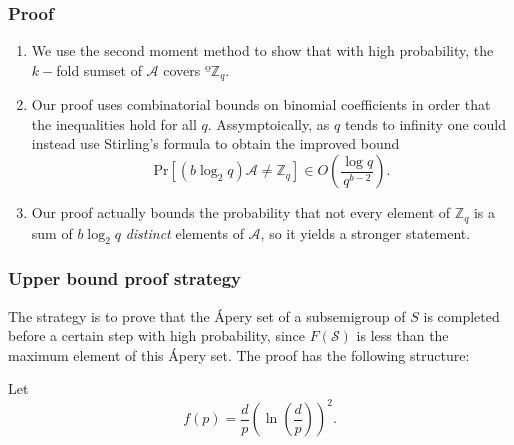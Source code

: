 \documentclass{beamer}
\def\ZZ{\ensuremath{\mathbb{Z}}}
\def\Pr{\ensuremath{\mathrm{Pr}}}
\begin{document}
\begin{frame}
    \frametitle{Proof}
    \begin{enumerate}
        \item We use the second moment method to show that with high probability, the $k-$fold sumset of $\mathcal{A}$ covers $º\ZZ_q$.
        \item Our proof uses combinatorial bounds on binomial coefficients in order that the inequalities hold for all $q$. Assymptoically, as $q$ tends to infinity one could instead use Stirling's formula to obtain the improved bound
        \[\Pr\left[(b\log_2q)\mathcal{A} \neq \mathbb{Z}_q\right] \in O\left(\frac{\log q}{q^{b - 2}}\right).\]
        \item Our proof actually bounds the probability that not every element of $\ZZ_q$ is a sum of $b\log_2 q$ \textit{distinct} elements of $\mathcal{A}$, so it yields a stronger statement. 
    \end{enumerate}
    \end{frame}

\begin{frame}
    \frametitle{Upper bound proof strategy}
    The strategy is to prove that the Ápery set of a subsemigroup of $S$ is completed before a certain step with high probability, since $F(\mathcal{S})$ is less than the maximum element of this Ápery set. The proof has the following structure: \par
    Let
    \[f(p) = \frac{d}{p}\left(\ln\left(\frac{d}{p}\right)\right)^2.\]

    
\end{frame}
\end{document}
